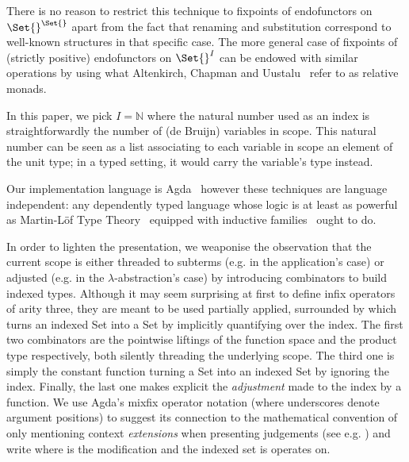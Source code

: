 There is no reason to restrict this technique to fixpoints of endofunctors
on $\Set{}^{\Set{}}$ apart from the fact that renaming and substitution
correspond to well-known structures in that specific case. The more general
case of fixpoints of (strictly positive) endofunctors on $\Set{}^I$ can be
endowed with similar operations by using what Altenkirch, Chapman and
Uustalu~\citeyear{Altenkirch2010, JFR4389} refer to as relative monads.

In this paper, we pick $I = \mathbb{N}$ where the natural number used as
an index is straightforwardly the number of (de Bruijn) variables in scope.
This natural number can be seen as a list associating to each variable in
scope an element of the unit type; in a typed setting, it would carry the
variable's type instead.

Our implementation language is Agda~\cite{norell2009dependently} however
these techniques are language independent: any dependently typed language
whose logic is at least as powerful as Martin-L\"of Type
Theory~\cite{martin1982constructive} equipped with inductive
families~\cite{dybjer1994inductive} ought to do.

In order to lighten the presentation, we weaponise the observation that the
current scope is either threaded to subterms (e.g. in the application's case)
or adjusted (e.g. in the $\lambda$-abstraction's case) by introducing combinators
to build indexed types. Although it may seem surprising at first to define
infix operators of arity three, they are meant to be used partially applied,
surrounded by \AF{[\_]} which turns an indexed Set into a Set by implicitly
quantifying over the index. The first two combinators are the pointwise liftings
of the function space and the product type respectively, both silently threading
the underlying scope. The third one is simply the constant function turning a Set
into an indexed Set by ignoring the index. Finally, the last one makes explicit
the \emph{adjustment} made to the index by a function. We use Agda's mixfix operator
notation (where underscores denote argument positions) to suggest its connection
to the mathematical convention of only mentioning context \emph{extensions} when
presenting judgements (see e.g. \cite{martin1982constructive}) and write
   where  is the modification and 
the indexed set is operates on.

